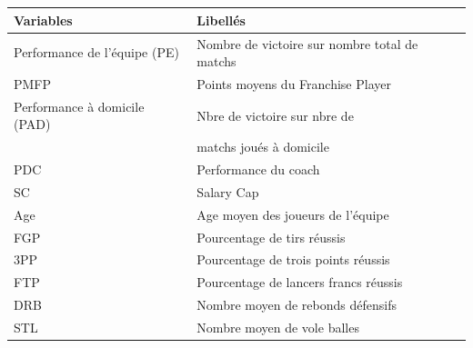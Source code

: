 \documentclass[10pt]{beamer}
\begin{document}
\section{}
\begin{frame}{}
\begin{block}{}
\end{block}
\end{frame}


\begin{frame}{}
\begin{columns}
\begin{column}{1\textwidth} 	
		\vspace*{-0.5cm}
		\begin{center}
		\textbf{}
		\end{center}
	\vspace*{-0.5cm}
	
		
		\begin{center} 
			\renewcommand{\arraystretch}{1.2}
			\footnotesize
			\begin{tabular}{||l||l||}
				\hline \hline
		\textbf{Variables}	&\textbf{Libellés}  \\
				\hline \hline
	Performance de l'équipe (PE) & Nombre de victoire sur nombre total de matchs \\ 
        PMFP &  Points moyens du Franchise Player \\ 
        Performance à domicile (PAD) &  Nbre de victoire sur nbre de \\ & matchs joués à domicile \\ 
       PDC & Performance du coach \\ 
       SC & Salary Cap \\ 
        Age & Age moyen des joueurs de l'équipe \\ 
        FGP & Pourcentage de tirs réussis \\ 
        3PP & Pourcentage de trois points réussis \\ 
        FTP & Pourcentage de lancers francs réussis \\ 
        DRB & Nombre moyen de rebonds défensifs \\
        STL & Nombre moyen de vole balles\\

				\hline \hline
				
			\end{tabular} 
		\end{center}
\color{black}
\end{column}
\end{columns}
\end{frame}
\end{document}
